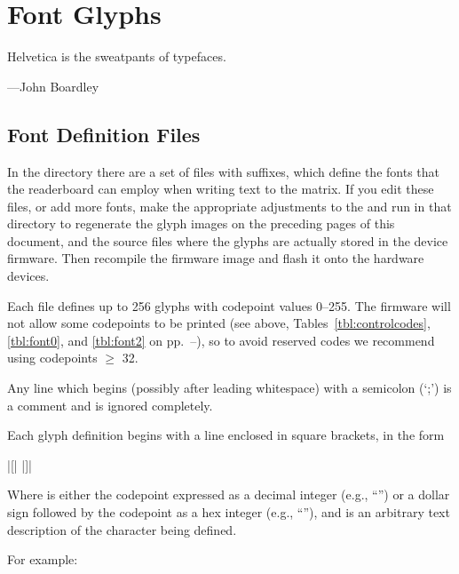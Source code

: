 %                               
\chapter{Font Glyphs}\label{chap:fonts}
\epigraph{Helvetica is the sweatpants of typefaces.}{---John Boardley}

\section{Font Definition Files}
In the  directory there are a set of files with  suffixes,
which define the fonts that the readerboard can employ when writing text to the matrix.
If you edit these files, or add more fonts, make the appropriate adjustments to the
 and run  in that directory to regenerate the glyph images on the
preceding pages of this document, and the source files where the glyphs are actually
stored in the device firmware. Then recompile the firmware image and flash it onto
the hardware devices.

Each file defines up to 256 glyphs with codepoint values 0--255. The firmware will not
allow some codepoints to be printed (see above, Tables~\ref{tbl:controlcodes}, \ref{tbl:font0}, and \ref{tbl:font2} on pp.~\pageref{tbl:controlcodes}--\pageref{tbl:font2}), so to avoid reserved codes we recommend using codepoints $\ge$ 32. 

Any line which begins (possibly after leading whitespace) with a semicolon (`\z;') is a comment and is ignored completely.

Each glyph definition begins with a line enclosed in square brackets, in the form
\begin{center}
	\begin{Coding}
		|[| |]|
	\end{Coding}
\end{center}
Where  is either the codepoint expressed as a decimal integer (e.g., ``'') or
a dollar sign followed by the codepoint as a hex integer (e.g., ``''), and
 is an arbitrary text description of the character being defined.

For example:

